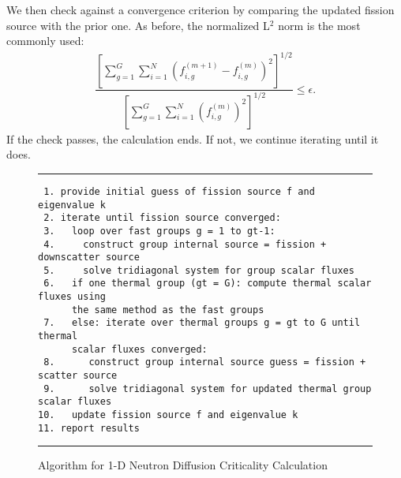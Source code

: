 We then check against a convergence criterion by comparing the updated fission source with the prior one. As before, the normalized L$^2$ norm is the most commonly used:
\begin{align}
  \dfrac{ \left[ \displaystyle\sum_{g=1}^G \sum_{i=1}^N \left( f_{i,g}^{(m+1)} - f_{i,g}^{(m)} \right)^2 \right]^{1/2} }
  		{ \left[ \displaystyle\sum_{g=1}^G \sum_{i=1}^N \left( f_{i,g}^{(m)} \right)^2 \right]^{1/2} }  \le \epsilon .
\end{align}
If the check passes, the calculation ends. If not, we continue iterating until it does.

\begin{figure}[tb!]
\begin{center}
\noindent \rule{\textwidth}{1pt}
\begin{verbatim}
 1. provide initial guess of fission source f and eigenvalue k
 2. iterate until fission source converged:
 3.   loop over fast groups g = 1 to gt-1:
 4.     construct group internal source = fission + downscatter source
 5.     solve tridiagonal system for group scalar fluxes
 6.   if one thermal group (gt = G): compute thermal scalar fluxes using
      the same method as the fast groups 
 7.   else: iterate over thermal groups g = gt to G until thermal 
      scalar fluxes converged:
 8.      construct group internal source guess = fission + scatter source
 9.      solve tridiagonal system for updated thermal group scalar fluxes
10.   update fission source f and eigenvalue k
11. report results 
\end{verbatim}
\rule{\textwidth}{1pt}
\caption{Algorithm for 1-D Neutron Diffusion Criticality Calculation}
\label{Fig:neutronics_criticalityDiffusionCalculation}
\end{center}
\end{figure}






